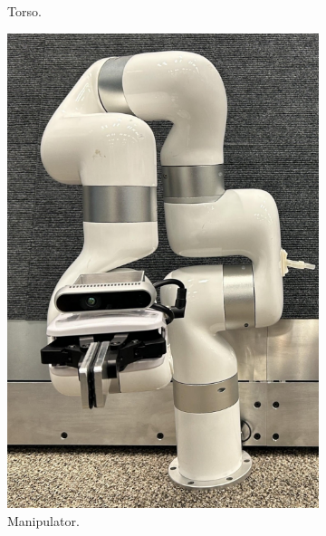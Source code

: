 \documentclass[runningheads,a4paper]{llncs}
\begin{document}
\begin{figure}[tbp]
\begin{minipage}[b]{0.25\linewidth}
\begin{subfigure}[b]{\linewidth}
			\caption{Torso.}
			\label{fig:component_torso}
		\end{subfigure}
	\end{minipage}
	\hspace{0.01\linewidth}
	\begin{minipage}[b]{0.25\linewidth}
		\centering
		\begin{subfigure}[b]{\linewidth}
			\includegraphics[width=\linewidth]{images/component_manipulator.png}
			\caption{Manipulator.}
			\label{fig:component_arm}
		\end{subfigure}
		\begin{subfigure}[b]{\linewidth}

\end{subfigure}
\end{minipage}
\end{figure}
\end{document}

